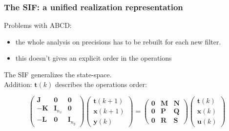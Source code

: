 \begin{frame}
	\frametitle{The SIF: a unified realization representation}
	Problems with ABCD:
	\begin{itemize}
		\item the whole analysis on precisions has to be rebuilt for each new filter.
		\item this doesn't gives an explicit order in the operations
	\end{itemize}

	The SIF generalizes the state-space.\\
	Addition: $\boldsymbol{t}(k)$ describes the operations order:

	\begin{equation} \label{sifdef}
		\begin{pmatrix}
			\boldsymbol{J} & \boldsymbol{0} & \boldsymbol{0} \\
			\boldsymbol{-K} & \boldsymbol{I}_{n_x} & \boldsymbol{0} \\
			\boldsymbol{-L} & \boldsymbol{0} & \boldsymbol{I}_{n_y} 
		\end{pmatrix}
		\begin{pmatrix}
			\boldsymbol{t} (k+1)  \\
			\boldsymbol{x} (k+1)  \\
			\boldsymbol{y} (k) 
		\end{pmatrix}
		=
		\begin{pmatrix}
			\boldsymbol{0} & \boldsymbol{M} & \boldsymbol{N} \\
			\boldsymbol{0} & \boldsymbol{P} & \boldsymbol{Q} \\
			\boldsymbol{0} & \boldsymbol{R} & \boldsymbol{S} 
		\end{pmatrix}
		\begin{pmatrix}
			\boldsymbol{t} (k)  \\
			\boldsymbol{x} (k)  \\
			\boldsymbol{u} (k) 
		\end{pmatrix}
	\end{equation}

\end{frame}

